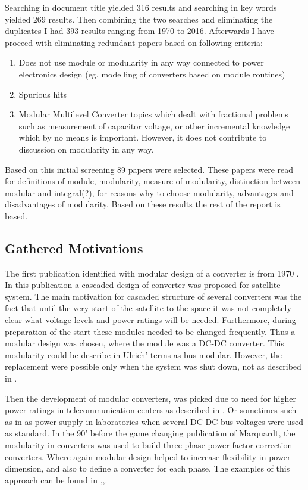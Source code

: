 \documentclass[]{scrartcl}
\begin{document}
Searching in document title yielded 316 results and searching in key words yielded 269 results. Then combining the two searches and eliminating the duplicates I had 393 results ranging from 1970 to 2016. Afterwards I have proceed with eliminating redundant papers based on following criteria:
\begin{enumerate}
	\item Does not use module or modularity in any way connected to power electronics design (eg. modelling of converters based on module routines)
	\item Spurious hits
	\item Modular Multilevel Converter topics which dealt with fractional problems such as measurement of capacitor voltage, or other incremental knowledge which by no means is important. However, it does not contribute to discussion on modularity in any way.
\end{enumerate} 

Based on this initial screening 89 papers were selected. These papers were read for definitions of module, modularity, measure of modularity, distinction between modular and integral(?), for reasons why to choose modularity, advantages and disadvantages of modularity.  Based on these results the rest of the report is based.

\subsection{Gathered Motivations}

The first publication identified with modular design of a converter is from 1970 \cite{Landsman1970}. In this publication a cascaded design of converter was proposed for satellite system. The main motivation for cascaded structure of several converters was the fact that until the very start of the satellite to the space it was not completely clear what voltage levels and power ratings will be needed. Furthermore, during preparation of the start these modules needed to be changed frequently. Thus a modular design was chosen, where the module was a DC-DC converter. This modularity could be describe in Ulrich' terms as bus modular. However, the replacement were possible only when the system was shut down, not as described in \cite{Cottet2015}.

Then the development of modular converters, was picked due to need for higher power ratings in telecommunication centers as described in \cite{Nuechteriein}.  Or sometimes such as in \cite{Bishop} as power supply in laboratories when several DC-DC bus voltages were used as standard.  In the 90' before the game changing publication of Marquardt, the modularity in converters was used to build three phase power factor correction converters. Where again modular design helped to increase flexibility in power dimension, and also to define a converter for each phase. The examples of this approach can be found in \cite{Ho1998},\cite{Hui},\cite{Ho2000}.
\end{document}
